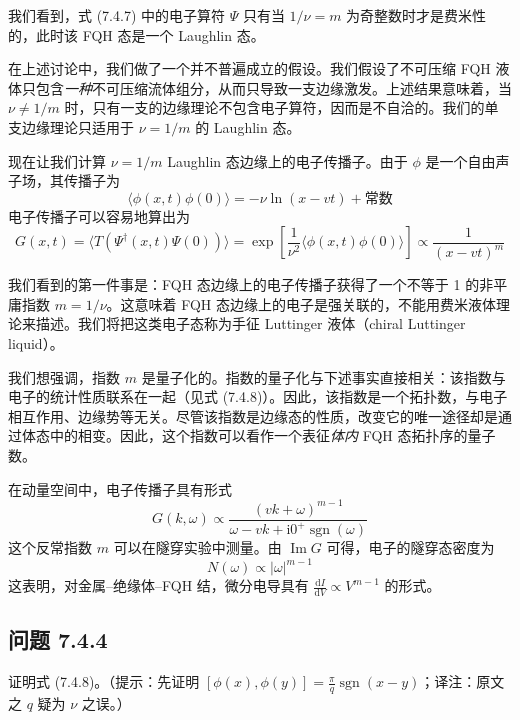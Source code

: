 我们看到，式 (7.4.7) 中的电子算符 $\Psi$ 只有当 $1/\nu=m$ 为奇整数时才是费米性的，此时该 FQH 态是一个 Laughlin 态。

在上述讨论中，我们做了一个并不普遍成立的假设。我们假设了不可压缩 FQH 液体只包含\emph{一种}不可压缩流体组分，从而只导致一支边缘激发。上述结果意味着，当 $\nu\neq1/m$ 时，只有一支的边缘理论不包含电子算符，因而是不自洽的。我们的单支边缘理论只适用于 $\nu=1/m$ 的 Laughlin 态。

现在让我们计算 $\nu=1/m$ Laughlin 态边缘上的电子传播子。由于 $\phi$ 是一个自由声子场，其传播子为
\begin{equation*}
\langle\phi(x,t)\phi(0)\rangle=-\nu\ln(x-vt)+\text{常数}
\end{equation*}
电子传播子可以容易地算出为
\begin{equation*}
G(x,t)=\langle T(\Psi^\dagger(x,t)\Psi(0))\rangle=\exp[\frac{1}{\nu^2}\langle\phi(x,t)\phi(0)\rangle]\propto\frac{1}{(x-vt)^m}
\tag{7.4.9}
\end{equation*}

我们看到的第一件事是：FQH 态边缘上的电子传播子获得了一个不等于 1 的非平庸指数 $m=1/\nu$。这意味着 FQH 态边缘上的电子是强关联的，不能用费米液体理论来描述。我们将把这类电子态称为手征 Luttinger 液体（chiral Luttinger liquid）。

我们想强调，指数 $m$ 是量子化的。指数的量子化与下述事实直接相关：该指数与电子的统计性质联系在一起（见式 (7.4.8)）。因此，该指数是一个拓扑数，与电子相互作用、边缘势等无关。尽管该指数是边缘态的性质，改变它的唯一途径却是通过体态中的相变。因此，这个指数可以看作一个表征\emph{体内} FQH 态拓扑序的量子数。

在动量空间中，电子传播子具有形式
\begin{equation*}
G(k,\omega)\propto\frac{(vk+\omega)^{m-1}}{\omega-vk+\mathrm{i}0^+\operatorname{sgn}(\omega)}
\end{equation*}
这个反常指数 $m$ 可以在隧穿实验中测量。由 $\operatorname{Im}G$ 可得，电子的隧穿态密度为
\begin{equation*}
N(\omega)\propto|\omega|^{m-1}
\end{equation*}
这表明，对金属--绝缘体--FQH 结，微分电导具有 $\frac{\mathrm{d}I}{\mathrm{d}V}\propto V^{m-1}$ 的形式。

\subsection*{问题 7.4.4}

证明式 (7.4.8)。（提示：先证明 $[\phi(x),\phi(y)]=\frac{\pi}{q}\operatorname{sgn}(x-y)$；译注：原文之 $q$ 疑为 $\nu$ 之误。）

